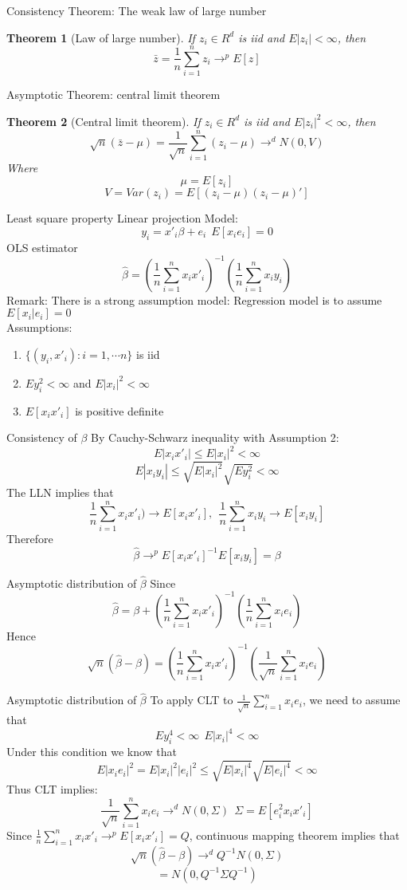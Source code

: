 \documentclass{beamer}
\newtheorem{thm}{Theorem}[subsection]
\begin{document}
\begin{frame}{Consistency Theorem: The weak law of large number}
	\begin{thm}[Law of large number]
		If $z_i \in R^d$ is iid and $E|z_i| < \infty$, then
		\[\bar{z} = \frac{1}{n} \sum^n_{i=1} z_i \rightarrow^p E[z]\]
	\end{thm}
\end{frame}
\begin{frame}{Asymptotic Theorem: central limit theorem}
	\begin{thm}[Central limit theorem]
		If $z_i \in R^d$ is iid and $E|z_i|^2 < \infty$, then 
		\[\sqrt{n} (\bar{z} - \mu) = \frac{1}{\sqrt{n}} \sum^n_{i=1} (z_i - \mu) \rightarrow^d N(0,V)\]
		Where
		\[\mu = E[z_i]\]
		\[V = Var(z_i) = E[(z_i - \mu)(z_i - \mu)']\]
	\end{thm}
\end{frame}
\begin{frame}{Least square property}
	Linear projection Model:
	\[y_i = x'_i \beta + e_i  \ \ E[x_ie_i]=0\]
	OLS estimator
	\[\hat{\beta} = (\frac{1}{n} \sum^n_{i=1} x_ix'_i)^{-1} (\frac{1}{n} \sum^n_{i=1} x_iy_i)\]
	Remark: There is a strong assumption model: Regression model is to assume $E[x_i|e_i]=0$ \\
	Assumptions:
	\begin{enumerate}
		\item $\{(y_i,x'_i): i=1,\cdots n\}$ is iid
		\item $Ey^2_i< \infty$ and $E|x_i|^2 < \infty$
		\item $E[x_ix'_i]$ is positive definite
	\end{enumerate}
\end{frame}
\begin{frame}{Consistency of $\beta$}
By Cauchy-Schwarz inequality with Assumption 2: 
\[E|x_ix'_i| \leq E|x_i|^2 < \infty\]
\[E|x_i y_i|\leq \sqrt{E|x_i|^2} \sqrt{Ey^2_i} < \infty\]
The LLN implies that 
\[\frac{1}{n} \sum^n_{i=1} x_ix'_i) \rightarrow E[x_i x'_i], \ \ \frac{1}{n} \sum^n_{i=1} x_iy_i \rightarrow E[x_iy_i]\]
Therefore
\[\hat{\beta} \rightarrow^p E[x_i x'_i]^{-1} E[x_iy_i] = \beta\]
\end{frame}
\begin{frame}{Asymptotic distribution of $\hat{\beta}$}
	Since
\[\hat{\beta} = \beta + (\frac{1}{n} \sum^n_{i=1} x_ix'_i)^{-1} (\frac{1}{n} \sum^n_{i=1} x_ie_i)\]
Hence
\[\sqrt{n}(\hat{\beta} - \beta) = (\frac{1}{n} \sum^n_{i=1} x_ix'_i)^{-1}(\frac{1}{\sqrt{n}} \sum^n_{i=1} x_ie_i)\]
\end{frame}
\begin{frame}{Asymptotic distribution of $\hat{\beta}$}
	To apply CLT to $\frac{1}{\sqrt{n}} \sum^n_{i=1} x_ie_i$, we need to assume that 
	\[Ey^4_i < \infty \ \ E|x_i|^4 < \infty \]
	Under this condition we know that 
	\[E|x_ie_i|^2 = E|x_i|^2|e_i|^2 \leq \sqrt{E|x_i|^4} \sqrt{E|e_i|^4} < \infty\]
	Thus CLT implies:
	\[\frac{1}{\sqrt{n}} \sum^n_{i=1} x_i e_i \rightarrow^d N(0, \Sigma) \ \ \Sigma = E[e^2_ix_ix'_i]\]
	Since $\frac{1}{n} \sum^n_{i=1} x_ix'_i \rightarrow^p E[x_ix'_i] =Q$, continuous mapping theorem implies that  
	\[\sqrt{n}(\hat{\beta} - \beta) \rightarrow^d Q^{-1}N(0,\Sigma)\]
	\[ = N(0,Q^{-1}\Sigma Q^{-1})\]
\end{frame}
\end{document}
